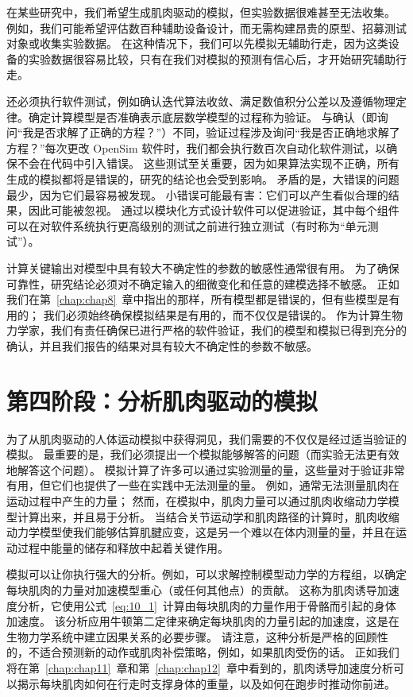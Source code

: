 在某些研究中，我们希望生成肌肉驱动的模拟，但实验数据很难甚至无法收集。
例如，我们可能希望评估数百种辅助设备设计，而无需构建昂贵的原型、招募测试对象或收集实验数据。
在这种情况下，我们可以先模拟无辅助行走，因为这类设备的实验数据很容易比较，只有在我们对模拟的预测有信心后，才开始研究辅助行走。


还必须执行软件测试，例如确认迭代算法收敛、满足数值积分公差以及遵循物理定律。确定计算模型是否准确表示底层数学模型的过程称为验证。
与确认（即询问“我是否求解了正确的方程？”）不同，验证过程涉及询问“我是否正确地求解了方程？”每次更改 OpenSim 软件时，我们都会执行数百次自动化软件测试，以确保不会在代码中引入错误。
这些测试至关重要，因为如果算法实现不正确，所有生成的模拟都将是错误的，研究的结论也会受到影响。
矛盾的是，大错误的问题最少，因为它们最容易被发现。
小错误可能最有害：它们可以产生看似合理的结果，因此可能被忽视。
通过以模块化方式设计软件可以促进验证，其中每个组件可以在对软件系统执行更高级别的测试之前进行独立测试（有时称为“单元测试”）。


计算关键输出对模型中具有较大不确定性的参数的敏感性通常很有用。
为了确保可靠性，研究结论必须对不确定输入的细微变化和任意的建模选择不敏感。
正如我们在第~\ref{chap:chap8}~章中指出的那样，所有模型都是错误的，但有些模型是有用的；
我们必须始终确保模拟结果是有用的，而不仅仅是错误的。
作为计算生物力学家，我们有责任确保已进行严格的软件验证，我们的模型和模拟已得到充分的确认，并且我们报告的结果对具有较大不确定性的参数不敏感。


\section{第四阶段：分析肌肉驱动的模拟}

为了从肌肉驱动的人体运动模拟中获得洞见，我们需要的不仅仅是经过适当验证的模拟。
最重要的是，我们必须提出一个模拟能够解答的问题（而实验无法更有效地解答这个问题）。
模拟计算了许多可以通过实验测量的量，这些量对于验证非常有用，但它们也提供了一些在实践中无法测量的量。
例如，通常无法测量肌肉在运动过程中产生的力量；
然而，在模拟中，肌肉力量可以通过肌肉收缩动力学模型计算出来，并且易于分析。
当结合关节运动学和肌肉路径的计算时，肌肉收缩动力学模型使我们能够估算肌腱应变，这是另一个难以在体内测量的量，并且在运动过程中能量的储存和释放中起着关键作用。


模拟可以让你执行强大的分析。例如，可以求解控制模型动力学的方程组，以确定每块肌肉的力量对加速模型重心（或任何其他点）的贡献。
这称为肌肉诱导加速度分析，它使用公式~\ref{eq:10_1}~计算由每块肌肉的力量作用于骨骼而引起的身体加速度。
该分析应用牛顿第二定律来确定每块肌肉的力量引起的加速度，这是在生物力学系统中建立因果关系的必要步骤。
请注意，这种分析是严格的回顾性的，不适合预测新的动作或肌肉补偿策略，例如，如果肌肉受伤的话。
正如我们将在第~\ref{chap:chap11}~章和第~\ref{chap:chap12}~章中看到的，肌肉诱导加速度分析可以揭示每块肌肉如何在行走时支撑身体的重量，以及如何在跑步时推动你前进。


